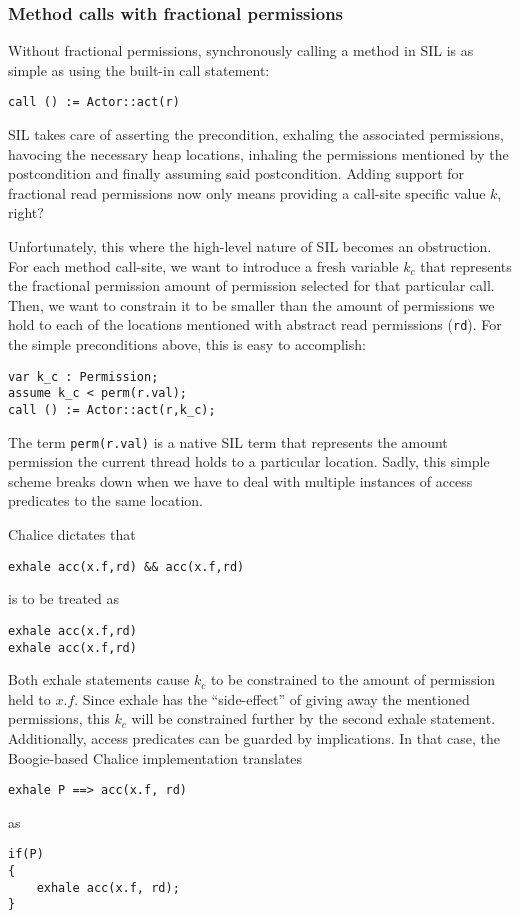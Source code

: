 \subsubsection{Method calls with fractional permissions}\label{sct:methcall}
Without fractional permissions, synchronously calling a method in SIL is as simple as using the built-in call statement:

\begin{lstlisting}[language=SIL]
call () := Actor::act(r)
\end{lstlisting}

SIL takes care of asserting the precondition, exhaling the associated permissions, havocing the necessary heap locations, inhaling the permissions mentioned by the postcondition and finally assuming said postcondition. Adding support for fractional read permissions now only means providing a call-site specific value $k$, right? 

Unfortunately, this where the high-level nature of SIL becomes an obstruction. 
For each method call-site, we want to introduce a fresh variable $k_c$ that represents the fractional permission amount of permission selected for that particular call. 
Then, we want to constrain it to be smaller than the amount of permissions we hold to each of the locations mentioned with abstract read permissions (\lstinline!rd!). For the simple preconditions above, this is easy to accomplish:

\begin{lstlisting}[language=SIL]
var k_c : Permission;
assume k_c < perm(r.val);
call () := Actor::act(r,k_c);
\end{lstlisting}

The term \lstinline!perm(r.val)! is a native SIL term that represents the amount permission the current thread holds to a particular location. 
Sadly, this simple scheme breaks down when we have to deal with multiple instances of access predicates to the same location.

Chalice dictates that
\begin{lstlisting}[language=SIL]
exhale acc(x.f,rd) && acc(x.f,rd)
\end{lstlisting}
is to be treated as
\begin{lstlisting}[language=SIL]
exhale acc(x.f,rd)
exhale acc(x.f,rd)
\end{lstlisting}

Both exhale statements cause $k_c$ to be constrained to the amount of permission held to $x.f$. 
Since exhale has the “side-effect” of giving away the mentioned permissions, this $k_c$ will be constrained further by the second exhale statement.
Additionally, access predicates can be guarded by implications. 
In that case, the Boogie-based Chalice implementation translates 
\begin{lstlisting}[language=Chalice]
exhale P ==> acc(x.f, rd) 
\end{lstlisting}
as
\begin{lstlisting}[language=Chalice]
if(P) 
{ 
	exhale acc(x.f, rd);
}
\end{lstlisting}

